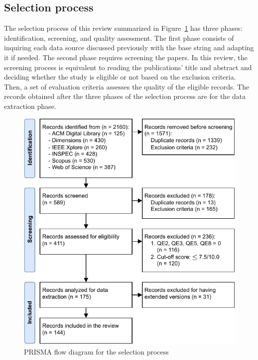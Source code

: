 \documentclass[10pt,a4paper,notitlepage,twocolumn,oneside]{article}
\begin{document}
\subsection{Selection process}
\label{sec:methodology:selection}

The selection process of this review summarized in Figure~\ref{fig:methodology:prisma-flow} has three phases: identification, screening, and quality assessment. The first phase consists of inquiring each data source discussed previously with the base string and adapting it if needed. The second phase requires screening the papers. In this review, the screening process is equivalent to reading the publications' title and abstract and deciding whether the study is eligible or not based on the exclusion criteria. Then, a set of evaluation criteria assesses the quality of the eligible records. The records obtained after the three phases of the selection process are for the data extraction phase.

\begin{figure}[h]
  \centering
  \includegraphics[width=\columnwidth]{figures/selection.pdf}
  \caption{PRISMA flow diagram for the selection process}
  \label{fig:methodology:prisma-flow}
\end{figure}
\end{document}
